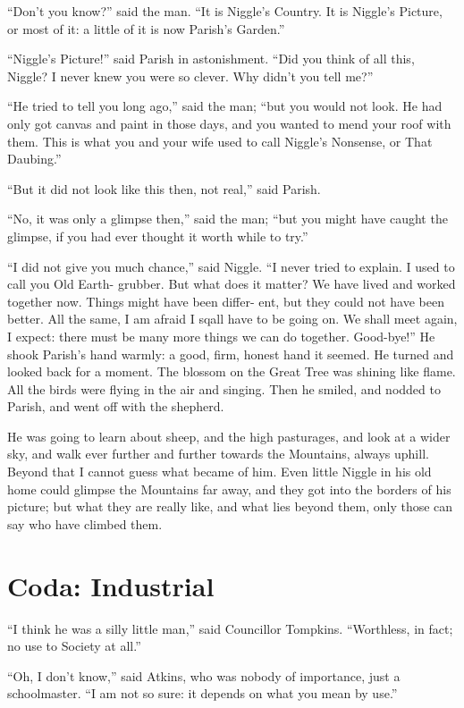 \documentclass[english]{scrartcl}
\begin{document}
“Don’t you know?” said the man. “It is Niggle’s Country. It is Niggle’s Picture, or most of it: a little of it is now Parish’s Garden.”

“Niggle’s Picture!” said Parish in astonishment. “Did you think of all this, Niggle? I never knew you were so clever. Why didn’t you tell me?”

“He tried to tell you long ago,” said the man; “but you would not look. He had only got canvas and paint in those days, and you wanted to mend your roof with them. This is what you and your wife used to call Niggle’s Nonsense, or That Daubing.”

“But it did not look like this then, not real,” said Parish.

“No, it was only a glimpse then,” said the man; “but you might have caught the glimpse, if you had ever thought it worth while to try.”

“I did not give you much chance,” said Niggle. “I never tried to explain. I used to call you Old Earth- grubber. But what does it matter? We have lived and worked together now. Things might have been differ- ent, but they could not have been better. All the same, I am afraid I sqall have to be going on. We shall meet again, I expect: there must be many more things we can do together. Good-bye!” He shook Parish’s hand warmly: a good, firm, honest hand it seemed. He turned and looked back for a moment. The blossom on the Great Tree was shining like flame. All the birds were flying in the air and singing. Then he smiled, and nodded to Parish, and went off with the shepherd.

He was going to learn about sheep, and the high pasturages, and look at a wider sky, and walk ever further and further towards the Mountains, always uphill. Beyond that I cannot guess what became of him. Even little Niggle in his old home could glimpse the Mountains far away, and they got into the borders of his picture; but what they are really like, and what lies beyond them, only those can say who have climbed them.

\section*{Coda: Industrial}

“I think he was a silly little man,” said Councillor Tompkins. “Worthless, in fact; no use to Society at all.”

“Oh, I don’t know,” said Atkins, who was nobody of importance, just a schoolmaster. “I am not so sure: it depends on what you mean by use.”
\end{document}
